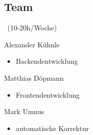 \subsection{Team}

\begin{frame}{\insertsectionhead}{\insertsubsectionhead~(10-20h/Woche)}
  \begin{block}{Alexander Kühnle}
    \begin{itemize}
      \item Backendentwicklung
    \end{itemize}
  \end{block}
  
  \pause

  \begin{block}{Matthias Döpmann}
    \begin{itemize}
      \item Frontendentwicklung
    \end{itemize}
  \end{block}
  
  \pause

  \begin{block}{Mark Umnus}
    \begin{itemize}
      \item automatische Korrektur 
    \end{itemize}
  \end{block}
\end{frame}
